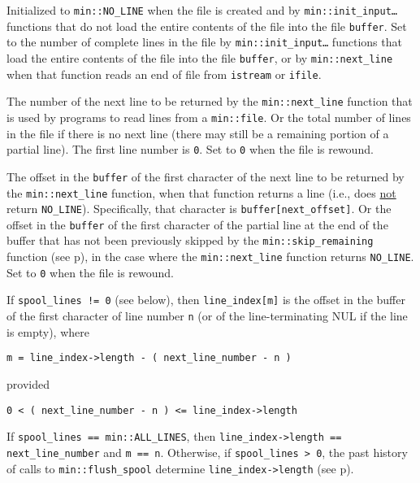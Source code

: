\documentclass[12pt]{article}
\makeatletter
\newcommand{\TT}[1]{{\tt \bfseries #1}}
\newcommand{\ttmkey}[2]{\TT{#1}\index{#1@{\tt #1}!#2}}
\newcommand{\pagref}[1]{p\pageref{#1}}
\newcommand{\EOL}{\penalty \exhyphenpenalty}
\newenvironment{itemlist}[1][1.2in]%
	{\begin{list}{}{\setlength{\labelwidth}{#1}%
		        \setlength{\leftmargin}{\labelwidth}%
		        \addtolength{\leftmargin}{+0.2in}%
		        \renewcommand{\makelabel}[1]{##1\hfill}}}%
	{\end{list}}
\makeatother
\begin{document}
\begin{itemlist}[1.4in]
Initialized to {\tt min::\EOL NO\_\EOL LINE} when the file is created and by
{\tt min::\EOL init\_\EOL input\ldots} functions that do not load
the entire contents of the file into the file {\tt buffer}.
Set to the number of complete lines in the file
by {\tt min::\EOL init\_\EOL input\ldots} functions that load
the entire contents of the file into the file {\tt buffer}, or
by {\tt min::\EOL next\_\EOL line} when that function
reads an end of file from {\tt istream} or {\tt ifile}.

\item[\ttmkey{next\_\EOL line\_\EOL number}{in {\tt min::file}}]
The number of the next line to be returned by the
{\tt min::\EOL next\_\EOL line}
function that is used by programs to read lines from a {\tt min::\EOL file}.
Or the total number of lines in the file if there is no next line
(there may still be a remaining portion of a partial line).
The first line number is {\tt 0}.  Set to {\tt 0} when the
file is rewound.

\item[\ttmkey{next\_\EOL offset}{in {\tt min::file}}]
The offset in the {\tt buffer} of the first character of the
next line to be returned by the {\tt min::\EOL next\_\EOL line}
function, when that function returns a line (i.e., does \underline{not}
return {\tt NO\_\EOL LINE}).
Specifically,
that character is {\tt buffer[next\_\EOL offset]}.
Or the offset in the {\tt buffer} of the first character of the
partial line at the end of the buffer
that has not been previously skipped by
the {\tt min::\EOL skip\_\EOL remaining} function
(see \pagref{MIN::SKIP_REMAINING}),
in the case where the {\tt min::\EOL next\_\EOL line}
function returns {\tt NO\_\EOL LINE}.
Set to {\tt 0} when the file is rewound.

\item[\ttmkey{line\_\EOL index}{in {\tt min::file}}]
If {\tt spool\_lines~!=~0} (see below), then
{\tt line\_index[m]} is the offset in the buffer of the first
character of line number {\tt n} (or of the line-terminating NUL
if the line is empty), where
\begin{center}
{\tt m = line\_index->length - ( next\_line\_number - n )}
\end{center}
provided
\begin{center}
{\tt 0 < ( next\_line\_number - n ) <= line\_index->length}
\end{center}
If {\tt spool\_lines~==~min::ALL\_LINES}, then
{\tt line\_\EOL index->\EOL length == next\_\EOL line\_\EOL number}
and {\tt m~==~n}.
Otherwise, if {\tt spool\_lines~>~0}, the past history
of calls to {\tt min::\EOL flush\_\EOL spool} determine
{\tt line\_\EOL index->\EOL length} (see \pagref{LINE-INDEX-LENGTH}).


\end{itemlist}
\end{document}
